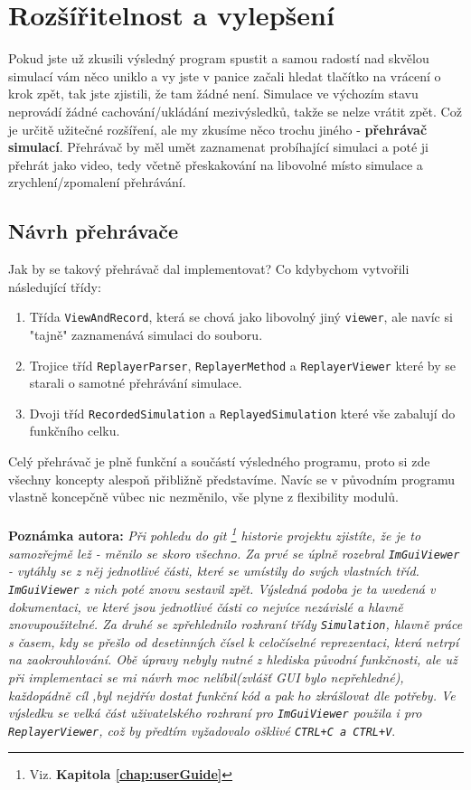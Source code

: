 \chapter{Rozšířitelnost a vylepšení}

Pokud jste už zkusili výsledný program spustit a samou radostí nad skvělou simulací vám něco uniklo a vy jste v panice začali hledat tlačítko na vrácení o krok zpět, tak jste zjistili, že tam žádné není. Simulace ve výchozím stavu neprovádí žádné cachování/ukládání mezivýsledků, takže se nelze vrátit zpět. Což je určitě užitečné rozšíření, ale my zkusíme něco trochu jiného - \textbf{přehrávač simulací}.
Přehrávač by měl umět zaznamenat probíhající simulaci a poté ji přehrát jako video, tedy včetně přeskakování na libovolné místo simulace a zrychlení/zpomalení přehrávání.

\section{Návrh přehrávače}
Jak by se takový přehrávač dal implementovat?
Co kdybychom vytvořili následující třídy:
\begin{enumerate}
	\item Třída \texttt{ViewAndRecord}, která se chová jako libovolný jiný \texttt{viewer}, ale navíc si "tajně" zaznamenává simulaci do souboru. 
	\item Trojice tříd \texttt{ReplayerParser}, \texttt{ReplayerMethod} a \texttt{ReplayerViewer} které by se starali o samotné přehrávání simulace.
	\item Dvoji tříd \texttt{RecordedSimulation} a \texttt{ReplayedSimulation} které vše zabalují do funkčního celku.
\end{enumerate}
Celý přehrávač je plně funkční a součástí výsledného programu, proto si zde všechny koncepty alespoň přibližně představíme.
Navíc se v původním programu vlastně koncepčně vůbec nic nezměnilo, vše plyne z flexibility modulů.
\\
\\
\textbf{Poznámka autora:}  \textit{Při pohledu do git
	\footnote{Viz. \textbf{Kapitola \ref{chap:userGuide} }}
historie projektu zjistíte, že je to samozřejmě lež - měnilo se skoro všechno. Za prvé se úplně rozebral \texttt{ImGuiViewer} - vytáhly se z něj jednotlivé části, které se umístily do svých vlastních tříd. \texttt{ImGuiViewer} z nich poté znovu sestavil zpět. Výsledná podoba je ta uvedená v dokumentaci, ve které jsou jednotlivé části co nejvíce nezávislé a hlavně znovupoužitelné.
Za druhé se zpřehlednilo rozhraní třídy \texttt{Simulation}, hlavně práce s časem, kdy se přešlo od desetinných čísel k celočíselné reprezentaci, která netrpí na zaokrouhlování.
Obě úpravy nebyly nutné z hlediska původní funkčnosti, ale už při implementaci se mi návrh moc nelíbil(zvlášť GUI bylo nepřehledné), každopádně cíl ,byl nejdřív dostat funkční kód a pak ho zkrášlovat dle potřeby.
Ve výsledku se velká část uživatelského rozhraní pro \texttt{ImGuiViewer} použila i pro \texttt{ReplayerViewer}, což by předtím vyžadovalo ošklivé \texttt{\small CTRL+C a  CTRL+V}}.

